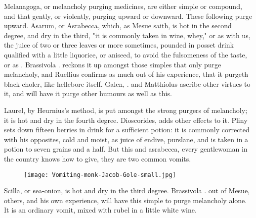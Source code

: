 {Melanagoga, or melancholy purging medicines, are either simple or compound, and that gently, or violently, purging upward or downward. These following purge upward. Asarum, or Asrabecca, which, as Mesue saith, is hot in the second degree, and dry in the third, "it is commonly taken in wine, whey," or as with us, the juice of two or three leaves or more sometimes, pounded in posset drink qualified with a little liquorice, or aniseed, to avoid the fulsomeness of the taste, or as . Brassivola . reckons it up amongst those simples that only purge melancholy, and Ruellius confirms as much out of his experience, that it purgeth black choler, like hellebore itself. Galen, . and Matthiolus ascribe other virtues to it, and will have it purge other humours as well as this.

Laurel, by Heurnius's method,  is put amongst the strong purgers of melancholy; it is hot and dry in the fourth degree. Dioscorides,  adds other effects to it. Pliny sets down fifteen berries in drink for a sufficient potion: it is commonly corrected with his opposites, cold and moist, as juice of endive, purslane, and is taken in a potion to seven grains and a half. But this and asrabecca, every gentlewoman in the country knows how to give, they are two common vomits.

\begin{figure}[tbh]
  \begingroup
  \centering
  \texttt{[image: Vomiting-monk-Jacob-Gole-small.jpg]}
  \label{fig:vomitingmonk}
\end{figure}

Scilla, or sea-onion, is hot and dry in the third degree. Brassivola . out of Mesue, others, and his own experience, will have this simple to purge melancholy alone. It is an ordinary vomit,  mixed with rubel in a little white wine.

}
